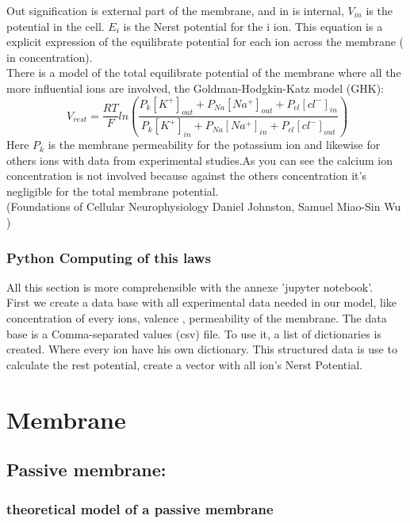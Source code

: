 \documentclass[a4paper,10pt]{report}
\begin{document}
 Out signification is external part of the membrane, and in is internal, $V_{in}$ is the potential in the cell. $E_{i}$ is the Nerst potential for the i ion.
 This equation is a explicit expression of the equilibrate potential for each ion across the membrane ( in concentration).\\
 There is a model of the total equilibrate potential of the membrane where all the more influential ions are involved, the Goldman-Hodgkin-Katz model (GHK):
 $$
 \ V_{rest}= \frac{RT}{F}ln(\frac{P_{k}[K^{+}]_{out}+P_{Na}[Na^{+}]_{out}+P_{cl}[cl^{-}]_{in}}{P_{k}[K^{+}]_{in}+P_{Na}[Na^{+}]_{in}+P_{cl}[cl^{-}]_{out}})
 $$
 Here $P_{k}$ is the membrane permeability for the potassium ion and likewise for others ions with data from experimental studies.As you can see the calcium ion concentration is not involved because against the others concentration it's negligible for the total membrane potential. \\
 (Foundations of Cellular Neurophysiology Daniel Johnston, Samuel Miao-Sin Wu ) 
 
 \subsection{Python Computing of this laws}
 All this section is more comprehensible with the annexe 'jupyter notebook'.\\
 
 First we create a data base with all experimental data needed in our model, like concentration of every ions, valence , permeability of the membrane. The data base is a Comma-separated values (csv) file. To use it, a list of  dictionaries is created. Where every ion have his own dictionary. This structured data is use to calculate the rest potential, create a vector with all ion's Nerst Potential.   
\chapter{ Membrane }
  
 
 \section{ Passive membrane:}
 \subsection{theoretical model of a passive membrane}
 
 
\end{document}
